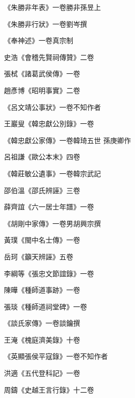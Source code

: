 \begin{pinyinscope}
 《朱勝非年表》一卷勝非孫昱上



 《朱勝非行狀》一卷劉岑撰



 《奉神述》一卷真宗制



 史浩《會稽先賢祠傳贊》二卷



 張栻《諸葛武侯傳》一卷



 趙彥博《昭明事實》二卷



 《呂文靖公事狀》一卷不知作者



 王巖叟《韓忠獻公別錄》一卷



 《韓忠獻公家傳》一卷韓琦五世
 孫庚卿作



 呂祖謙《歐公本末》四卷



 《韓莊敏公遺事》一卷韓宗武記



 邵伯溫《邵氏辨誣》三卷



 薛齊誼《六一居士年譜》一卷



 《胡剛中家傳》一卷男胡興宗撰



 黃璞《閩中名士傳》一卷



 岳珂《籲天辨誣》五卷



 李綱等《張忠文節誼錄》一卷



 陳曄《種師道事跡》一卷



 張琰《種師道祠堂碑》一卷



 《談氏家傳》一卷談鑰撰



 王淹《槐庭濟美錄》十卷



 《英顯張侯平寇錄》一卷不知作者



 洪適《五代登科記》一卷



 周鑄《史越王言行錄》十二卷




\end{pinyinscope}
